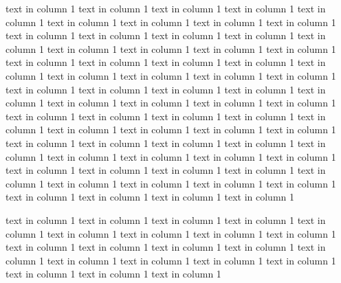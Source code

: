 \documentclass{article}
\begin{document}
 text in column 1  text in column 1  text in column 1  text in column 1  text in column 1  text in column 1  text in column 1  text in column 1  text in column 1  text in column 1  text in column 1  text in column 1  text in column 1  text in column 1  text in column 1  text in column 1  text in column 1  text in column 1  text in column 1  text in column 1  text in column 1  text in column 1  text in column 1  text in column 1  text in column 1  text in column 1  text in column 1  text in column 1  text in column 1  text in column 1  text in column 1  text in column 1  text in column 1  text in column 1  text in column 1  text in column 1  text in column 1  text in column 1  text in column 1  text in column 1  text in column 1  text in column 1  text in column 1  text in column 1  text in column 1  text in column 1  text in column 1  text in column 1  text in column 1  text in column 1  text in column 1  text in column 1  text in column 1  text in column 1  text in column 1  text in column 1  text in column 1  text in column 1  text in column 1  text in column 1  text in column 1  text in column 1  text in column 1  text in column 1  text in column 1  text in column 1  text in column 1

 text in column 1  text in column 1  text in column 1  text in column 1  text in column 1  text in column 1  text in column 1  text in column 1  text in column 1  text in column 1  text in column 1  text in column 1  text in column 1  text in column 1  text in column 1  text in column 1  text in column 1  text in column 1  text in column 1  text in column 1  text in column 1
\end{document}
